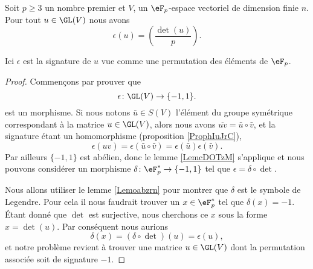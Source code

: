 \begin{theorem}
    Soit \( p\geq 3\) un nombre premier et \( V\), un \( \eF_p\)-espace vectoriel de dimension finie \( n\). Pour tout \( u\in\GL(V)\) nous avons
    \begin{equation}
        \epsilon(u)=\left(\frac{\det(u)}{p}\right).
    \end{equation}
\end{theorem}
Ici \( \epsilon\) est la signature de \( u \) vue comme une permutation des éléments de \( \eF_p\).

\begin{proof}
    Commençons par prouver que
    \begin{equation}
        \epsilon\colon \GL(V)\to \{ -1,1 \}.
    \end{equation}
    est un morphisme. Si nous notons \( \bar u\in S(V)\) l'élément du groupe symétrique correspondant à la matrice \( u\in \GL(V)\), alors nous avons \( \overline{ uv }=\bar u\circ\bar v\), et la signature étant un homomorphisme (proposition \ref{ProphIuJrC}), 
    \begin{equation}
        \epsilon(uv)=\epsilon(\bar u\circ\bar v)=\epsilon(\bar u)\epsilon(\bar v).
    \end{equation}
    Par ailleurs \( \{ -1,1 \}\) est abélien, donc le lemme \ref{LemcDOTzM} s'applique et nous pouvons considérer un morphisme \( \delta\colon \eF_p^*\to \{ -1,1 \}\) tel que \( \epsilon=\delta\circ\det\).

    Nous allons utiliser le lemme \ref{Lemoabzrn} pour montrer que \( \delta\) est le symbole de Legendre. Pour cela il nous faudrait trouver un \( x\in \eF_p^*\) tel que \( \delta(x)=-1\). Étant donné que \( \det\) est surjective, nous cherchons ce \( x\) sous la forme \( x=\det(u)\). Par conséquent nous aurions
    \begin{equation}
        \delta(x)=(\delta\circ\det)(u)=\epsilon(u),
    \end{equation}
    et notre problème revient à trouver une matrice \( u\in\GL(V)\) dont la permutation associée soit de signature \( -1\).


\end{proof}
